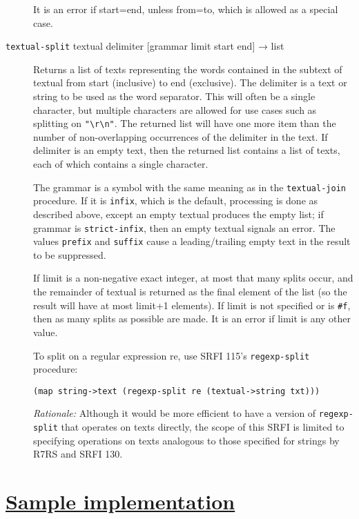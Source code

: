 \begin{description}
It is an error if start=end, unless from=to, which is allowed as a
special case.
\item[ \href{}{} \texttt{textual-split} textual delimiter {[}grammar
limit start end{]} → list ]
Returns a list of texts representing the words contained in the subtext
of textual from start (inclusive) to end (exclusive). The delimiter is a
text or string to be used as the word separator. This will often be a
single character, but multiple characters are allowed for use cases such
as splitting on \texttt{"\textbackslash{}r\textbackslash{}n"}. The
returned list will have one more item than the number of non-overlapping
occurrences of the delimiter in the text. If delimiter is an empty text,
then the returned list contains a list of texts, each of which contains
a single character.

The grammar is a symbol with the same meaning as in the
\texttt{textual-join} procedure. If it is \texttt{infix}, which is the
default, processing is done as described above, except an empty textual
produces the empty list; if grammar is \texttt{strict-infix}, then an
empty textual signals an error. The values \texttt{prefix} and
\texttt{suffix} cause a leading/trailing empty text in the result to be
suppressed.

If limit is a non-negative exact integer, at most that many splits
occur, and the remainder of textual is returned as the final element of
the list (so the result will have at most limit+1 elements). If limit is
not specified or is \texttt{\#f}, then as many splits as possible are
made. It is an error if limit is any other value.

To split on a regular expression re, use SRFI 115's
\texttt{regexp-split} procedure:

\begin{verbatim}
(map string->text (regexp-split re (textual->string txt)))
\end{verbatim}

\emph{Rationale:} Although it would be more efficient to have a version
of \texttt{regexp-split} that operates on texts directly, the scope of
this SRFI is limited to specifying operations on texts analogous to
those specified for strings by R7RS and SRFI 130.
\end{description}

\section{\texorpdfstring{\href{}{Sample
implementation}}{Sample implementation}}\label{sample-implementation}

